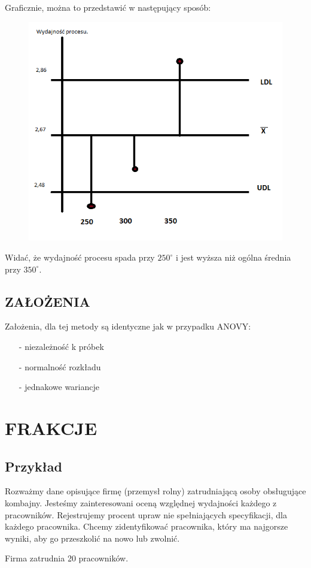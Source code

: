 \documentclass{beamer}
\begin{document}
  \begin{frame}
Graficznie, można to przedstawić w następujący sposób: 
\begin{figure}
\includegraphics[scale=0.5]{ANOM1.png}
\end{figure}

Widać, że wydajność procesu spada przy $250^\circ$ i jest wyższa niż ogólna średnia przy $350^\circ.$
 
\end{frame}

\subsection{ZAŁOŻENIA}
 \begin{frame}
Założenia, dla tej metody są identyczne jak w przypadku ANOVY:
\begin{enumerate}
		\item[-] niezależność k próbek
		\item[-] normalność rozkładu
		\item[-] jednakowe wariancje
	\end{enumerate} 

\end{frame} 

\section{FRAKCJE}
\subsection{Przykład}
\begin{frame}
Rozważmy dane opisujące firmę (przemysł rolny) zatrudniającą osoby obsługujące kombajny.  Jesteśmy zainteresowani oceną względnej wydajności każdego z pracowników. Rejestrujemy procent upraw nie spełniających specyfikacji, dla każdego pracownika. Chcemy zidentyfikować pracownika, który ma najgorsze wyniki, aby go przeszkolić na nowo lub zwolnić.

\bigskip

Firma zatrudnia 20 pracowników.\\
\end{frame}
\end{document}
